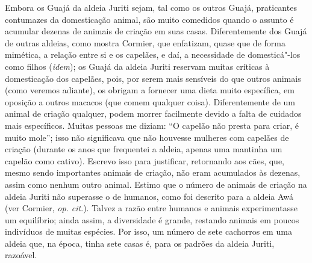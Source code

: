 Embora os Guajá da aldeia Juriti sejam, tal como os outros Guajá,
praticantes contumazes da domesticação animal, são muito comedidos
quando o assunto é acumular dezenas de animais de criação em suas casas.
Diferentemente dos Guajá de outras aldeias, como mostra Cormier, que
enfatizam, quase que de forma mimética, a relação entre si e os
capelães, e daí, a necessidade de domesticá"-los como filhos (\emph{idem}); os
Guajá da aldeia Juriti reservam muitas críticas à domesticação dos
capelães, pois, por serem mais sensíveis do que outros animais (como
veremos adiante), os obrigam a fornecer uma dieta muito específica, em
oposição a outros macacos (que comem qualquer coisa). Diferentemente de
um animal de criação qualquer, podem morrer facilmente devido a falta de
cuidados mais específicos. Muitas pessoas me diziam: ``O capelão não
presta para criar, é muito mole''; isso não significava que não houvesse
mulheres com capelães de criação (durante os anos que frequentei a
aldeia, apenas uma mantinha um capelão como cativo). Escrevo isso para
justificar, retornando aos cães, que, mesmo sendo importantes animais de
criação, não eram acumulados às dezenas, assim como nenhum outro animal.
Estimo que o número de animais de criação na aldeia Juriti não superasse
o de humanos, como foi descrito para a aldeia Awá (ver Cormier,
\emph{op. cit}.). Talvez a razão entre humanos e animais experimentasse um
equilíbrio; ainda assim, a diversidade é grande, restando animais em
poucos indivíduos de muitas espécies. Por isso, um número de sete
cachorros em uma aldeia que, na época, tinha sete casas é, para os
padrões da aldeia Juriti, razoável.

